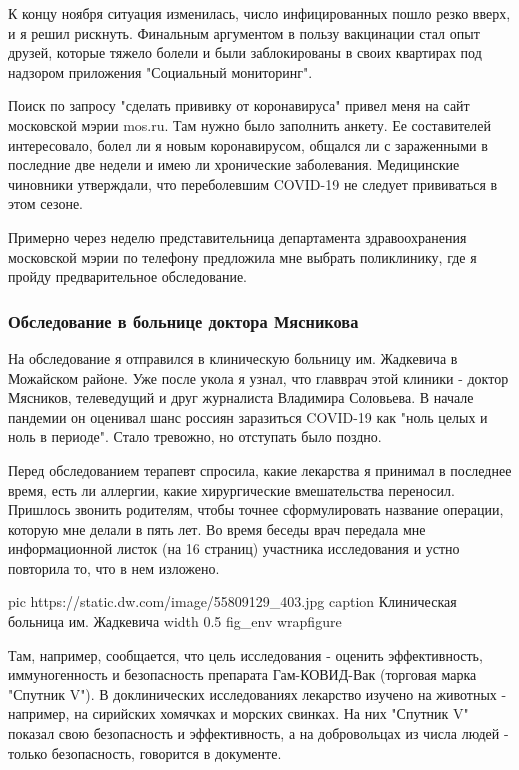 К концу ноября ситуация изменилась, число инфицированных пошло резко вверх, и я
решил рискнуть. Финальным аргументом в пользу вакцинации стал опыт друзей,
которые тяжело болели и были заблокированы в своих квартирах под надзором
приложения "Социальный мониторинг".

Поиск по запросу "сделать прививку от коронавируса" привел меня на сайт
московской мэрии mos.ru. Там нужно было заполнить анкету. Ее составителей
интересовало, болел ли я новым коронавирусом, общался ли с зараженными в
последние две недели и имею ли хронические заболевания. Медицинские чиновники
утверждали, что переболевшим COVID-19 не следует прививаться в этом сезоне.

Примерно через неделю представительница департамента здравоохранения московской
мэрии по телефону предложила мне выбрать поликлинику, где я пройду
предварительное обследование.

\subsubsection{Обследование в больнице доктора Мясникова}

На обследование я отправился в клиническую больницу им. Жадкевича в Можайском
районе. Уже после укола я узнал, что главврач этой клиники - доктор Мясников,
телеведущий и друг журналиста Владимира Соловьева. В начале пандемии он
оценивал шанс россиян заразиться COVID-19 как "ноль целых и ноль в периоде".
Стало тревожно, но отступать было поздно.

Перед обследованием терапевт спросила, какие лекарства я принимал в последнее
время, есть ли аллергии, какие хирургические вмешательства переносил. Пришлось
звонить родителям, чтобы точнее сформулировать название операции, которую мне
делали в пять лет. Во время беседы врач передала мне информационной листок (на
16 страниц) участника исследования и устно повторила то, что в нем изложено.

\ifcmt
	pic https://static.dw.com/image/55809129_403.jpg
	caption Клиническая больница им. Жадкевича
	width 0.5
	fig_env wrapfigure
\fi

Там, например, сообщается, что цель исследования - оценить эффективность,
иммуногенность и безопасность препарата Гам-КОВИД-Вак (торговая марка "Спутник
V"). В доклинических исследованиях лекарство изучено на животных - например, на
сирийских хомячках и морских свинках. На них "Спутник V" показал свою
безопасность и эффективность, а на добровольцах из числа людей - только
безопасность, говорится в документе.

